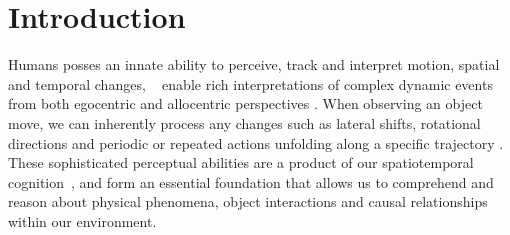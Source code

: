 \section{Introduction}
\label{sec:intro}
Humans posses an innate ability to perceive, track and interpret motion, spatial and temporal changes, ~\cite{DeFreitas2016Tracking, Marr1981Directional} enable rich interpretations of complex dynamic events from both egocentric and allocentric perspectives \cite{Burgess2006Spatial}. When observing an object move, we can inherently process any changes such as lateral shifts, rotational directions and periodic or repeated actions unfolding along a specific trajectory \cite{Burgess2006Spatial}. These sophisticated perceptual abilities are a product of our spatiotemporal cognition~\cite{Freyd1984Representational}, and form an essential foundation that allows us to comprehend and reason about physical phenomena, object interactions and causal relationships within our environment. ~\cite{Leslie1984Spatiotemporal, Johansson1973Visual}

